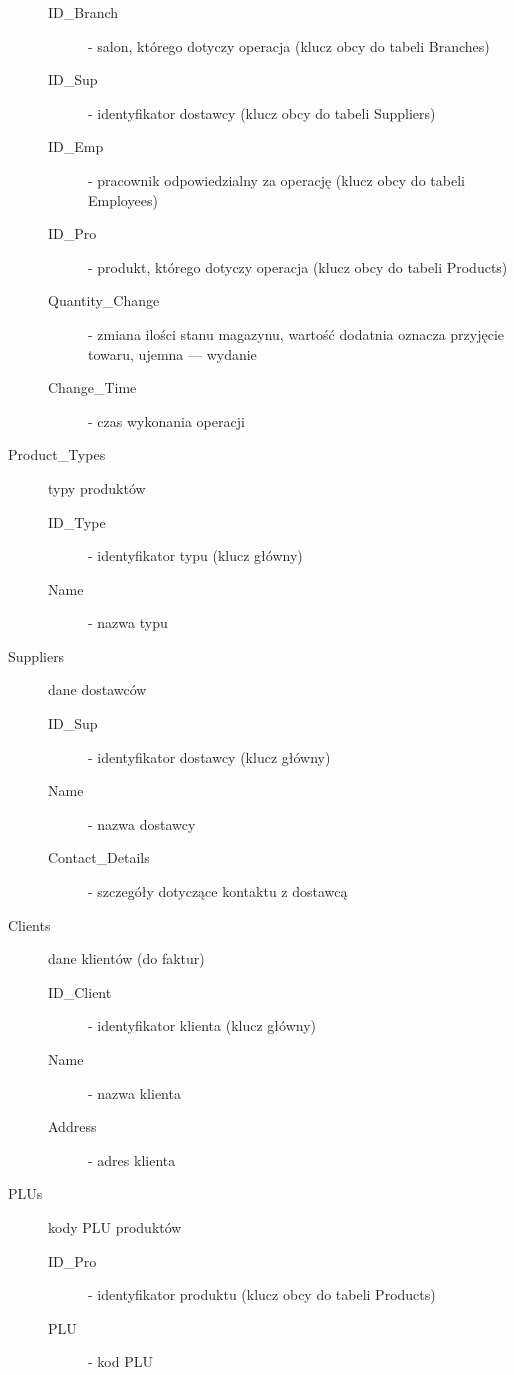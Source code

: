 \begin{description}
    \begin{description}
    \item[ID\_Branch] - salon, którego dotyczy operacja (klucz obcy do tabeli Branches)
    \item[ID\_Sup] - identyfikator dostawcy (klucz obcy do tabeli Suppliers)
    \item[ID\_Emp] - pracownik odpowiedzialny za operację (klucz obcy do tabeli Employees)
    \item[ID\_Pro] - produkt, którego dotyczy operacja (klucz obcy do tabeli Products)
    \item[Quantity\_Change] - zmiana ilości stanu magazynu, wartość dodatnia oznacza przyjęcie towaru, ujemna --- wydanie
    \item[Change\_Time] - czas wykonania operacji
    \end{description}
\item[Product\_Types] typy produktów
    \begin{description}
    \item[ID\_Type] - identyfikator typu (klucz główny)
    \item[Name] - nazwa typu
    \end{description}
\item[Suppliers] dane dostawców
    \begin{description}
    \item[ID\_Sup] - identyfikator dostawcy (klucz główny)
    \item[Name] - nazwa dostawcy
    \item[Contact\_Details] - szczegóły dotyczące kontaktu z dostawcą
    \end{description}
\item[Clients] dane klientów (do faktur)
    \begin{description}
    \item[ID\_Client] - identyfikator klienta (klucz główny)
    \item[Name] - nazwa klienta
    \item[Address] - adres klienta
    \end{description}
\item[PLUs] kody PLU produktów
    \begin{description}
    \item[ID\_Pro] - identyfikator produktu (klucz obcy do tabeli Products)
    \item[PLU] - kod PLU
    \end{description}
\end{description}

